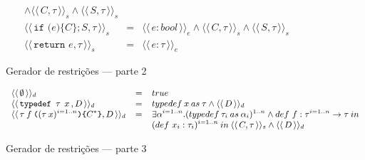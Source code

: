 \documentclass[a4paper,8pt]{article}
\newcommand{\constre}[1]{\ensuremath{\langle\langle\,#1\,\rangle\rangle_{e}}}
\newcommand{\constrc}[1]{\ensuremath{\langle\langle\,#1\,\rangle\rangle_{s}}}
\newcommand{\constrd}[1]{\ensuremath{\langle\langle\,#1\,\rangle\rangle_{d}}}
\begin{document}
\begin{figure}[h]
\[{\begin{array}{lcl}
                                                     \land
                                                     \constrc{C
                                                            , \tau}
                                                                \land \constrc{S,\tau}\\
             \constrc{\texttt{if (} e \texttt{)\{} C
             \texttt{\}} ; S , \tau} & = & \constre{e : bool}
                                                     \land
                                                     \constrc{C
                                       , \tau} \land \constrc{S,\tau}\\
             \constrc{\texttt{return }e, \tau} & = & \constre{e : \tau}
           \end{array}}
       \]
       \caption{Gerador de restrições --- parte 2}
     \end{figure}

     \begin{figure}[h]
       \[
         \small{
           \begin{array}{lcl}
               \constrd{\emptyset} & = & true \\
               \constrd{\texttt{typedef }\tau\:\:x\,,D} & = &
                                                             typedef\:x
                                                             \:as\:\tau
                                                             \land \constrd{D}\\
               \constrd{\tau\:f\:\texttt{(}(\tau\:x)^{i=1..n}\texttt{)}
             \texttt{\{}C^*\texttt{\}} , D} & = & \exists \alpha^{i =
                                                  1..n}. (typedef\:\tau_i\:as\:\alpha_i)^{1..n}
                                                  \land def\,\,f :
                                                       \tau^{i =
                                                       1.. n}\to \tau
                                                       \:in\\
                           & &
                                                       (def\,\,x_i :
                                                       \tau_i)^{i
                                                       = 1..n}\: in\:
                                                       \constrc{C,\tau}
                                                       \land \constrd{D}
           \end{array}
         }
       \]
       \caption{Gerador de restrições --- parte 3}
     \end{figure}
     
\end{document}
